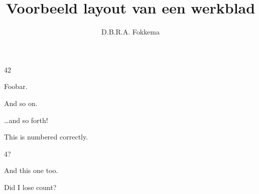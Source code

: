 

\usepackage{lipsum}

\title{Voorbeeld layout van een werkblad}
\author{D.B.R.A. Fokkema}



\maketitle

\begin{questions}


\question \lipsum[1]
\begin{solution}
  42
\end{solution}

\question Foobar.

\question And so on.
\begin{solution}
  \ldots{}and so forth!
\end{solution}



\question This is numbered correctly.
\begin{solution}
  4?
\end{solution}


\question And this one too.
\begin{solution}
  Did I lose count?
\end{solution}


\end{questions}

